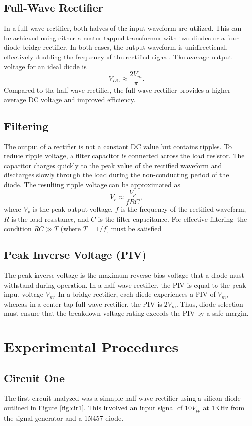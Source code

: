 \documentclass[12pt]{article}
\begin{document}
\subsection{Full-Wave Rectifier} In a full-wave rectifier, both halves of the
input waveform are utilized. This can be achieved using either a center-tapped
transformer with two diodes or a four-diode bridge rectifier. In both cases,
the output waveform is unidirectional, effectively doubling the frequency of
the rectified signal. The average output voltage for an ideal diode is
\[
	V_{DC} \approx \frac{2V_{m}}{\pi}.
\]
Compared to the half-wave rectifier, the full-wave rectifier provides a higher
average DC voltage and improved efficiency.

\subsection{Filtering}
The output of a rectifier is not a constant DC value but contains ripples. To
reduce ripple voltage, a filter capacitor is connected across the load
resistor. The capacitor charges quickly to the peak value of the rectified
waveform and discharges slowly through the load during the non-conducting
period of the diode. The resulting ripple voltage can be approximated as
\[
	V_{r} \approx \frac{V_{p}}{fRC},
\]
where $V_{p}$ is the peak output voltage, $f$ is the frequency of the rectified
waveform, $R$ is the load resistance, and $C$ is the filter capacitance. For
effective filtering, the condition $RC \gg T$ (where $T = 1/f$) must be
satisfied.

\subsection{Peak Inverse Voltage (PIV)} The peak inverse voltage is the maximum
reverse bias voltage that a diode must withstand during operation. In a
half-wave rectifier, the PIV is equal to the peak input voltage $V_{m}$. In a
bridge rectifier, each diode experiences a PIV of $V_{m}$, whereas in a
center-tap full-wave rectifier, the PIV is $2V_{m}$. Thus, diode selection must
ensure that the breakdown voltage rating exceeds the PIV by a safe margin.


\section{Experimental Procedures}
\subsection{Circuit One}
The first circuit analyzed was a simnple half-wave rectifier using a silicon
diode outlined in Figure \ref{fig:cir1}.
This involved an input signal of $10V_{pp}$ at 1KHz from the signal generator
and a 1N457 diode.
\end{document}

